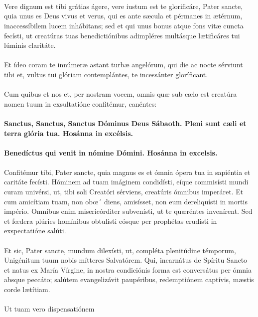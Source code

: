 \documentclass[12pt, a4paper]{article}
\begin{document}
	\\
	\\
	\\
	Vere dignum est tibi grátias ágere,
	vere iustum est te glorificáre, Pater
	sancte, quia unus es Deus vivus et
	verus, qui es ante sæcula et
	pérmanes in ætérnum,
	inaccessíbilem lucem inhábitans;
	sed et qui unus bonus atque fons
	vitæ cuncta fecísti, ut creatúras tuas
	benedictiónibus adimpléres
	multásque lætificáres tui lúminis
	claritáte.
	\\\\
	Et ídeo coram te innúmeræ astant
	turbæ angelórum, qui die ac nocte
	sérviunt tibi et, vultus tui glóriam
	contemplántes, te incessánter
	gloríficant.
	\\\\
	Cum quibus et nos et, per nostram
	vocem, omnis quæ sub cælo est creatúra nomen tuum in
	exsultatióne confitémur, canéntes:
	\\\\
	\textbf{Sanctus, Sanctus, Sanctus Dóminus
		Deus Sábaoth. Pleni sunt cæli et
		terra glória tua. Hosánna in
		excélsis.}
	\\\\
	\textbf{Benedíctus qui venit in nómine
		Dómini. Hosánna in excelsis.}
	\\\\
	Confitémur tibi, Pater sancte, quia
	magnus es et ómnia ópera tua in
	sapiéntia et caritáte fecísti.
	Hóminem ad tuam imáginem
	condidísti, eíque commisísti mundi
	curam univérsi, ut, tibi soli Creatóri
	sérviens, creatúris ómnibus
	imperáret. Et cum amicítiam tuam,
	non obœ´ diens, amisísset, non
	eum dereliquísti in mortis império.
	Omnibus enim misericórditer
	subvenísti, ut te quæréntes
	invenírent. Sed et fœdera plúries
	homínibus obtulísti eósque per
	prophétas erudísti in exspectatióne
	salúti.
	\\\\
	Et sic, Pater sancte, mundum
	dilexísti, ut, compléta plenitúdine
	témporum, Unigénitum tuum nobis
	mítteres Salvatórem. Qui,
	incarnátus de Spíritu Sancto et natus ex María Vírgine, in nostra
	condiciónis forma est conversátus
	per ómnia absque peccáto; salútem
	evangelizávit paupéribus,
	redemptiónem captívis, mæstis
	corde lætítiam.
	\\\\
	Ut tuam vero dispensatiónem
\end{document}
